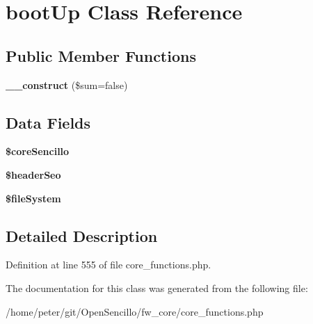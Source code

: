 \hypertarget{classboot_up}{\section{boot\-Up Class Reference}
\label{classboot_up}
}
\subsection*{Public Member Functions}
\begin{DoxyCompactItemize}
\item 
\hypertarget{classboot_up_ab7f16f959f74a634ca046420bd58c74b}{{\bfseries \-\_\-\-\_\-construct} (\$sum=false)}\label{classboot_up_ab7f16f959f74a634ca046420bd58c74b}

\end{DoxyCompactItemize}
\subsection*{Data Fields}
\begin{DoxyCompactItemize}
\item 
\hypertarget{classboot_up_a4ca9ecfa22bed04c85e24326a037cfd0}{{\bfseries \$core\-Sencillo}}\label{classboot_up_a4ca9ecfa22bed04c85e24326a037cfd0}

\item 
\hypertarget{classboot_up_a7281af4d471cc5f2e00d975905db660e}{{\bfseries \$header\-Seo}}\label{classboot_up_a7281af4d471cc5f2e00d975905db660e}

\item 
\hypertarget{classboot_up_a2b06fe777e2d4bac3ef970c8a984edaa}{{\bfseries \$file\-System}}\label{classboot_up_a2b06fe777e2d4bac3ef970c8a984edaa}

\end{DoxyCompactItemize}


\subsection{Detailed Description}


Definition at line 555 of file core\-\_\-functions.\-php.



The documentation for this class was generated from the following file\-:\begin{DoxyCompactItemize}
\item 
/home/peter/git/\-Open\-Sencillo/fw\-\_\-core/core\-\_\-functions.\-php\end{DoxyCompactItemize}
